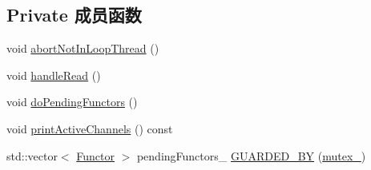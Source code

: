 \subsection*{Private 成员函数}
\begin{DoxyCompactItemize}
\item 
void \hyperlink{classmuduo_1_1net_1_1EventLoop_a6375a5e33170fe1ee0fcb82c68b684ba}{abort\+Not\+In\+Loop\+Thread} ()
\item 
void \hyperlink{classmuduo_1_1net_1_1EventLoop_a231ec0ec0313193a59b3f1326328ae50}{handle\+Read} ()
\item 
void \hyperlink{classmuduo_1_1net_1_1EventLoop_a52b9d01f6df5ea016514b924abda1299}{do\+Pending\+Functors} ()
\item 
void \hyperlink{classmuduo_1_1net_1_1EventLoop_aab9db454f555ffd9944fcd782e334d89}{print\+Active\+Channels} () const
\item 
std\+::vector$<$ \hyperlink{classmuduo_1_1net_1_1EventLoop_a322d335989ca5098875638110aafba84}{Functor} $>$ pending\+Functors\+\_\+ \hyperlink{classmuduo_1_1net_1_1EventLoop_a0107071979d65e26a8c7d1d7131af35e}{G\+U\+A\+R\+D\+E\+D\+\_\+\+BY} (\hyperlink{classmuduo_1_1net_1_1EventLoop_a6e1bf1809a42f40f1a21178dc6620a6f}{mutex\+\_\+})
\end{DoxyCompactItemize}
